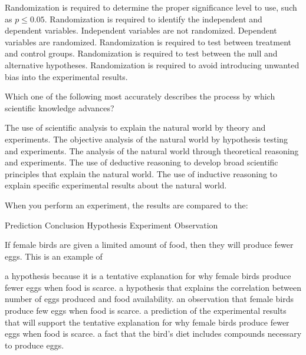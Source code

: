 \begin{choices}
\choice Randomization is required to determine the proper significance level to use, such as $p \le 0.05$.%
\choice Randomization is required to identify the independent and dependent variables. Independent variables are not randomized. Dependent variables are randomized.%
\choice Randomization is required to test between treatment and control groups.%
\choice Randomization is required to test between the null and alternative hypotheses.%
\correctchoice Randomization is required to avoid introducing unwanted bias into the experimental results.%
\end{choices}
 
\question
Which one of the following most accurately describes the process by which scientific knowledge advances? 

\begin{choices}
\choice The use of scientific analysis to explain the natural world by theory and experiments.%
\correctchoice The objective analysis of the natural world by hypothesis testing and experiments.%
\choice The analysis of the natural world through theoretical reasoning and experiments.%
\choice The use of deductive reasoning to develop broad scientific principles that explain the natural world.%
\choice The use of inductive reasoning to explain specific experimental results about the natural world.%
\end{choices}

\question
When you perform an experiment, the results are compared to the:

\begin{choices}
\correctchoice Prediction%
\choice Conclusion%
\choice Hypothesis%
\choice Experiment%
\choice Observation %
\end{choices}

\question
If female birds are given a limited amount of food, then they will produce fewer eggs.  This is an example of

\begin{choices}
\choice a hypothesis because it is a tentative explanation for why female birds produce fewer eggs when food is scarce.%
\choice a hypothesis that explains the correlation between number of eggs produced and food availability.%
\choice an observation that female birds produce few eggs when food is scarce.%
\correctchoice a prediction of the experimental results that will support the tentative explanation for why female birds produce fewer eggs when food is scarce.%
\choice a fact that the bird's diet includes compounds necessary to produce eggs.%
\end{choices}

